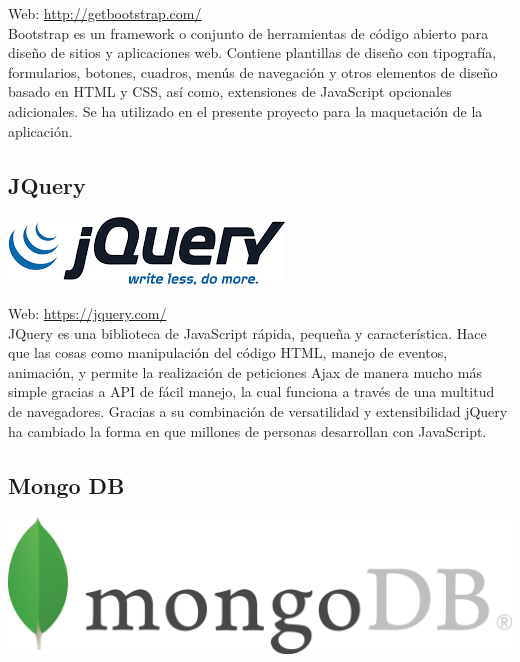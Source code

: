 Web: \url{http://getbootstrap.com/}\\

Bootstrap es un framework o conjunto de herramientas de código abierto para diseño de sitios y aplicaciones web. Contiene plantillas de diseño con tipografía, formularios, botones, cuadros, menús de navegación y otros elementos de diseño basado en HTML y CSS, así como, extensiones de JavaScript opcionales adicionales. Se ha utilizado en el presente proyecto para la maquetación de la aplicación.

\subsection{JQuery}


\begin{center}
\includegraphics[scale=0.7]{imagenes/jquery-logo.png}
\end{center}

Web: \url{https://jquery.com/}\\

JQuery es una biblioteca de JavaScript rápida, pequeña y característica. Hace que las cosas como manipulación del código HTML, manejo de eventos, animación, y permite la realización de 
peticiones Ajax de manera mucho más simple gracias a API de fácil manejo, la cual funciona a través de una multitud de navegadores. Gracias a su combinación de versatilidad y extensibilidad jQuery
ha cambiado la forma en que millones de personas desarrollan con JavaScript.\\


\subsection{Mongo DB}

\begin{center}
\includegraphics[scale=0.5]{imagenes/mongodb-logo.png}
\end{center}


